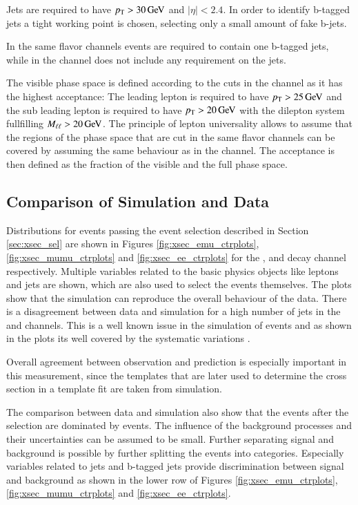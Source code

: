 Jets are required to have $p_{\mathrm{T}} > 30 \,\text{Ge\hspace{-.08em}V}$ and $|\eta|<2.4$. In order to identify b-tagged jets a tight working point is chosen, selecting only a small amount of fake b-jets.

In the same flavor channels events are required to contain one b-tagged jets, while in the \emu channel does not include any requirement on the jets.

The visible phase space is defined according to the cuts in the \emu channel as it has the highest acceptance:
The leading lepton is required to have $p_{\mathrm{T}} > 25 \,\text{Ge\hspace{-.08em}V}$ and the sub leading lepton is required to have $p_{\mathrm{T}} > 20 \,\text{Ge\hspace{-.08em}V}$ with the dilepton system
fullfilling $M_{\ell\ell} > 20 \,\text{Ge\hspace{-.08em}V}$. The principle of lepton universality allows to assume that the regions of the phase space that are cut in the 
same flavor channels can be covered by assuming the same behaviour as in the \emu channel.
The acceptance is then defined as the fraction of the visible and the full phase space. 



\subsection{Comparison of Simulation and Data}
\label{sec:xsec_datamc}

Distributions for events passing the event selection described in Section \ref{sec:xsec_sel} are shown in Figures \ref{fig:xsec_emu_ctrplots},\ref{fig:xsec_mumu_ctrplots} and \ref{fig:xsec_ee_ctrplots} for the \emu, \mumu and \ee decay channel respectively. Multiple variables related to the basic physics objects like leptons and jets are shown, which are also used to select the events themselves. The plots show that the simulation can reproduce the overall  behaviour of the data. 
There is a disagreement between data and simulation for a high number of jets in the \emu and \mumu channels. This is a well known issue in the simulation of \ttbar events and as shown in the plots its well covered by the systematic variations . 

Overall agreement between observation and prediction is especially important in this measurement, since the templates that are later used to determine the cross section in a template fit are taken from simulation.

The comparison between data and simulation also show that the events after the selection are dominated by \ttbar events. The influence of the background processes and their uncertainties can be assumed to be small.
Further separating signal and background is possible by further splitting the events into categories. Especially variables related to jets and b-tagged jets provide discrimination between signal and background as shown in the lower row of Figures 
\ref{fig:xsec_emu_ctrplots},\ref{fig:xsec_mumu_ctrplots} and \ref{fig:xsec_ee_ctrplots}.


